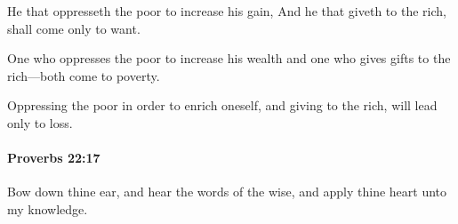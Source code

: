			\begin{versebox}
					\item[BHS] 
					\item[ASV] He that oppresseth the poor to increase his gain, And he that giveth to the rich, shall come only to want.
					\item[NIV] One who oppresses the poor to increase his wealth and one who gives gifts to the rich—both come to poverty.
					\item[NRSV] Oppressing the poor in order to enrich oneself, and giving to the rich, will lead only to loss.
			\end{versebox}

		\paragraph{Proverbs 22:17} %
			\label{PROVERBS-22-17}

			Bow down thine ear, and hear the words of the wise, and apply thine heart unto my knowledge.

